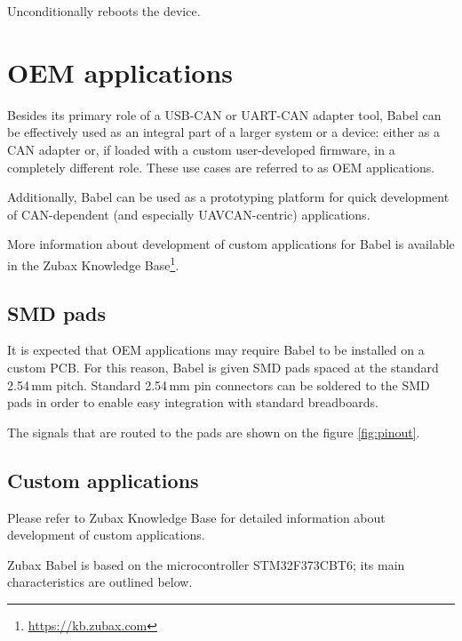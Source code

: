 \documentclass{zubaxdoc}
\begin{document}
Unconditionally reboots the device.

\chapter{OEM applications}\label{sec:oem_applications}

Besides its primary role of a USB-CAN or UART-CAN adapter tool,
Babel can be effectively used as an integral part of a larger system or a device:
either as a CAN adapter or, if loaded with a custom user-developed firmware,
in a completely different role.
These use cases are referred to as OEM applications.

Additionally, Babel can be used as a prototyping platform for quick development of CAN-dependent
(and especially UAVCAN-centric) applications.

More information about development of custom applications for Babel is available in the
Zubax Knowledge Base\footnote{\url{https://kb.zubax.com}}.

\section{SMD pads}

It is expected that OEM applications may require Babel to be installed on a custom PCB.
For this reason, Babel is given SMD pads spaced at the standard 2.54\,mm pitch.
Standard 2.54\,mm pin connectors can be soldered to the SMD pads in order to enable easy integration
with standard breadboards.

The signals that are routed to the pads are shown on the figure \ref{fig:pinout}.

\section{Custom applications}

Please refer to Zubax Knowledge Base for detailed information about development of custom applications.

Zubax Babel is based on the microcontroller STM32F373CBT6; its main characteristics are outlined below.
\end{document}
